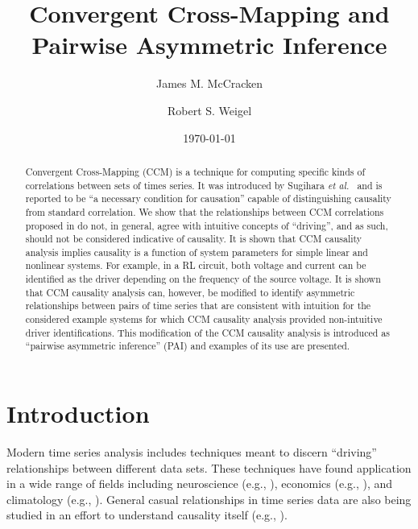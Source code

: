 \documentclass[twocolumn,aps,pre,groupedaddress]{revtex4-1}
\begin{document}
\title{Convergent Cross-Mapping and Pairwise Asymmetric Inference}
\author{James M. McCracken}
\author{Robert S. Weigel}
\date{\today}

\begin{abstract}
Convergent Cross-Mapping (CCM) is a technique for computing specific kinds of correlations between sets of times series.  It was introduced by Sugihara {\em et al.\ }\cite{Sugihara2012} and is reported to be ``a necessary condition for causation'' capable of distinguishing causality from standard correlation.  We show that the relationships between CCM correlations proposed in \cite{Sugihara2012} do not, in general, agree with intuitive concepts of ``driving'', and as such, should not be considered indicative of causality.  It is shown that CCM causality analysis implies causality is a function of system parameters for simple linear and nonlinear systems.  For example, in a RL circuit, both voltage and current can be identified as the driver depending on the frequency of the source voltage.  It is shown that CCM causality analysis can, however, be modified to identify asymmetric relationships between pairs of time series that are consistent with intuition for the considered example systems for which CCM causality analysis provided non-intuitive driver identifications.  This modification of the CCM causality analysis is introduced as ``pairwise asymmetric inference'' (PAI) and examples of its use are presented.  
\end{abstract}

\pacs{}
\maketitle

\section{Introduction}
Modern time series analysis includes techniques meant to discern ``driving'' relationships between different data sets.  These techniques have found application in a wide range of fields including neuroscience (e.g., \cite{Kaminski2001}), economics (e.g., \cite{dufour1998,dufour2006}), and climatology (e.g., \cite{mosedale2006}).  General casual relationships in time series data are also being studied in an effort to understand causality itself (e.g., \cite{eichler2012}).  
\end{document}
